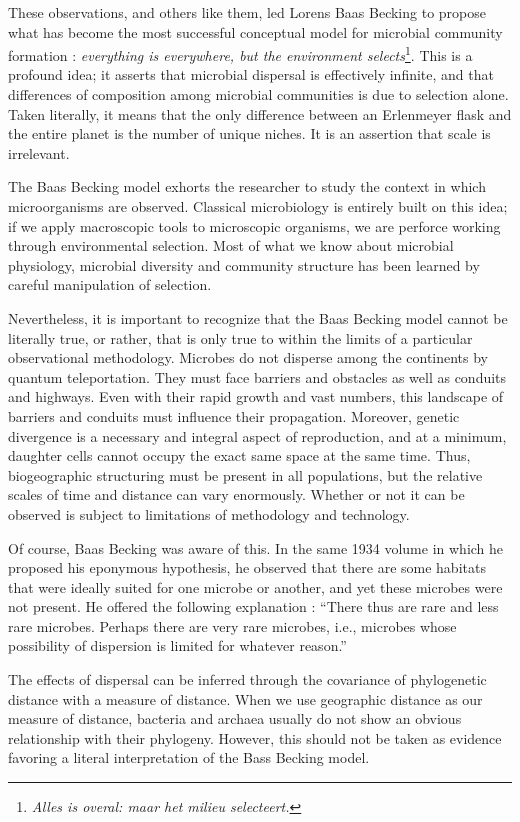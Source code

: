 These observations, and others like them, led Lorens Baas Becking to propose what has become the most successful conceptual model for microbial community formation : {\em everything is everywhere, but the environment selects}\footnote{{\em Alles is overal: maar het milieu selecteert.}}. This is a profound idea; it asserts that microbial dispersal is effectively infinite, and that differences of composition among microbial communities is due to selection alone. Taken literally, it means that the only difference between an Erlenmeyer flask and the entire planet is the number of unique niches. It is an assertion that scale is irrelevant.

The Baas Becking model exhorts the researcher to study the context in which microorganisms are observed. Classical microbiology is entirely built on this idea; if we apply macroscopic tools to microscopic organisms, we are perforce working through environmental selection. Most of what we know about microbial physiology, microbial diversity and community structure has been learned by careful manipulation of selection.

Nevertheless, it is important to recognize that the Baas Becking model cannot be literally true, or rather, that is only true to within the limits of a particular observational methodology. Microbes do not disperse among the continents by quantum teleportation. They must face barriers and obstacles as well as conduits and highways. Even with their rapid growth and vast numbers, this landscape of barriers and conduits must influence their propagation. Moreover, genetic divergence is a necessary and integral aspect of reproduction, and at a minimum, daughter cells cannot occupy the exact same space at the same time. Thus, biogeographic structuring must be present in all populations, but the relative scales of time and distance can vary enormously. Whether or not it can be observed is subject to limitations of methodology and technology.

Of course, Baas Becking was aware of this. In the same 1934 volume in which he proposed his eponymous hypothesis, he observed that there are some habitats that were ideally suited for one microbe or another, and yet these microbes were not present. He offered the following explanation : ``There thus are rare and less rare microbes. Perhaps there are very rare microbes, i.e., microbes whose possibility of dispersion is limited for whatever reason.''

The effects of dispersal can be inferred through the covariance of phylogenetic distance with a measure of distance. When we use geographic distance as our measure of distance, bacteria and archaea usually do not show an obvious relationship with their phylogeny. However, this should not be taken as evidence favoring a literal interpretation of the Bass Becking model.

